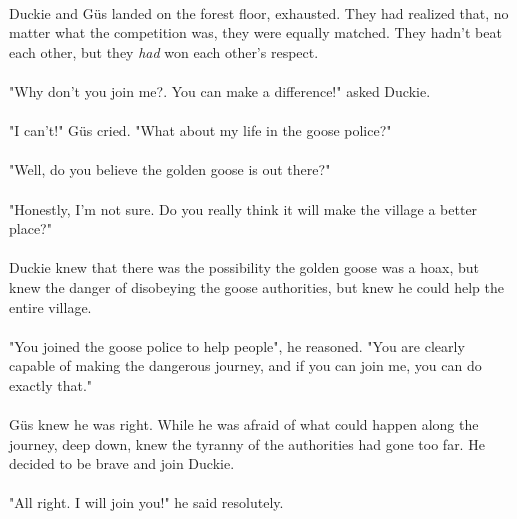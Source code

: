 \paragraph{} Duckie and Güs landed on the forest floor, exhausted. They had realized that, no matter what the competition was, they were equally matched. They hadn't beat each other, but they \textit{had} won each other's respect. 
\paragraph{} "Why don't you join me?. You can make a difference!" asked Duckie.
\paragraph{} "I can't!" Güs cried. "What about my life in the goose police?"
\paragraph{} "Well, do you believe the golden goose is out there?"
\paragraph{} "Honestly, I'm not sure. Do you really think it will make the village a better place?"
\paragraph{} Duckie knew that there was the possibility the golden goose was a hoax, but knew the danger of disobeying the goose authorities, but knew he could help the entire village. 
\paragraph{} "You joined the goose police to help people", he reasoned. "You are clearly capable of making the dangerous journey, and if you can join me, you can do exactly that."
\paragraph{} Güs knew he was right. While he was afraid of what could happen along the journey, deep down, knew the tyranny of the authorities had gone too far. He decided to be brave and join Duckie. 
\paragraph{} "All right. I will join you!" he said resolutely. 